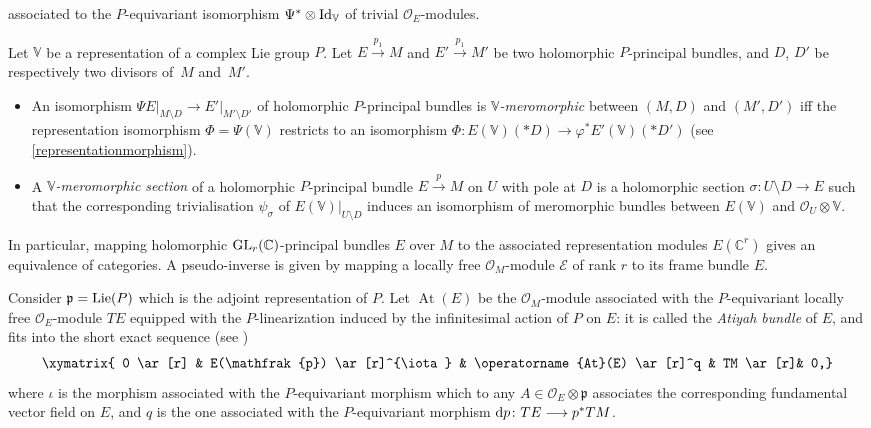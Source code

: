 \documentclass[pdftex]{sigma}
\numberwithin{equation}{section}
\begin{document}
 associated to the $P$-equivariant isomorphism $\Psi^* \otimes {\rm Id}_{\mathbb{V}}$ of trivial $\mathcal{O}_E$-modules.
\begin{Definition}\label{meromorphicisoprincipal}
Let $\mathbb{V}$ be a representation of a complex Lie group $P$. Let $E\overset{p_1}{\longrightarrow} M$ and $E'\overset{p_1}{\longrightarrow} M'$ be two holomorphic $P$-principal bundles, and $D$, $D'$ be respectively two divisors of~$M$ and~$M'$.
\begin{itemize}\itemsep=0pt
\item[$(1)$] An isomorphism $\Psi E\vert_{M\setminus D} \longrightarrow E'\vert_{M'\setminus D'}$ of holomorphic $P$-principal bundles is \textit{$\mathbb{V}$-mero\-mor\-phic} between $(M,D)$ and $(M',D')$ iff the representation isomorphism $\Phi=\Psi(\mathbb{V})$ restricts to an isomorphism $\Phi\colon E(\mathbb{V})(* D) \longrightarrow \varphi^* E'(\mathbb{V})(* D')$ (see \eqref{representationmorphism}).
\item[$(2)$] A \textit{$\mathbb{V}$-meromorphic section} of a holomorphic $P$-principal bundle $E\overset{p}{\longrightarrow} M$ on $U$ with pole at $D$ is a holomorphic section $\sigma\colon U\setminus D \longrightarrow E$ such that the corresponding trivialisation $\psi_\sigma$ of $E(\mathbb{V})\vert_{U\setminus D}$ induces an isomorphism of meromorphic bundles between $E(\mathbb{V})$ and $\mathcal{O}_U \otimes \mathbb{V}$.
 \end{itemize} \end{Definition}
In particular, mapping holomorphic ${\rm GL}_r(\mathbb{C})$-principal bundles $E$ over $M$ to the associated representation modules $E(\mathbb{C}^r)$ gives an equivalence of categories. A pseudo-inverse is given by mapping a locally free $\mathcal{O}_M$-module $\mathcal{E}$ of rank $r$ to its frame bundle $E$.

Consider $\mathfrak{p}={\rm Lie}(P)$ which is the adjoint representation of $P$. Let $\operatorname{At}(E)$ be the $\mathcal{O}_M$-module associated with the $P$-equivariant locally free $\mathcal{O}_E$-module $TE$ equipped with the $P$-linearization induced by the infinitesimal action of $P$ on $E$: it is called the \textit{Atiyah bundle} of $E$, and fits into the short exact sequence (see \cite[Theorem 1]{Atiyah})
\begin{gather}\label{Atiyah} \xymatrix{ 0 \ar[r] & E(\mathfrak{p}) \ar[r]^{\iota} & \operatorname{At}(E) \ar[r]^q & TM \ar[r]& 0,} \end{gather}
 where $\iota$ is the morphism associated with the $P$-equivariant morphism which to any $A \in \mathcal{O}_E \otimes \mathfrak{p}$ associates the corresponding fundamental vector field on $E$, and $q$ is the one associated with the $P$-equivariant morphism ${\rm d}p\colon TE \longrightarrow p^*TM$.
\end{document}
